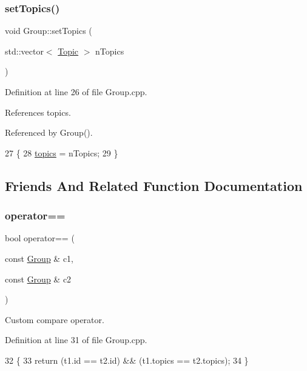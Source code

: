\subsubsection{\texorpdfstring{set\+Topics()}{setTopics()}}
{\footnotesize\ttfamily void Group\+::set\+Topics (\begin{DoxyParamCaption}\item[{std\+::vector$<$ \hyperlink{class_topic}{Topic} $>$}]{n\+Topics }\end{DoxyParamCaption})}



Definition at line 26 of file Group.\+cpp.



References topics.



Referenced by Group().


\begin{DoxyCode}
27 \{
28     \hyperlink{class_group_a5927c259318d2058c9d1573110718bb5}{topics} = nTopics;
29 \}
\end{DoxyCode}


\subsection{Friends And Related Function Documentation}
\mbox{\label{class_group_a5127806edb762fcce6c5450dcb17a395}} 
\subsubsection{\texorpdfstring{operator==}{operator==}}
{\footnotesize\ttfamily bool operator== (\begin{DoxyParamCaption}\item[{const \hyperlink{class_group}{Group} \&}]{c1,  }\item[{const \hyperlink{class_group}{Group} \&}]{c2 }\end{DoxyParamCaption})\hspace{0.3cm}{\ttfamily [friend]}}



Custom compare operator. 



Definition at line 31 of file Group.\+cpp.


\begin{DoxyCode}
32 \{
33     \textcolor{keywordflow}{return}  (t1.id == t2.id) && (t1.topics == t2.topics);
34 \}
\end{DoxyCode}


